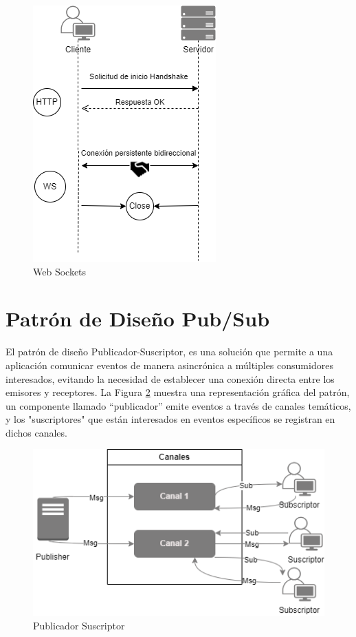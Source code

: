 \begin{figure}[h]
    \centering
    \includegraphics[width=0.5\linewidth]{fig/sockets.png}
    \caption{Web Sockets}
    \label{fig:sockets}
\end{figure}




\section{Patrón de Diseño Pub/Sub}\label{sec:pub-sub}

El patrón de diseño Publicador-Suscriptor, es una solución que permite a una aplicación comunicar eventos de manera asincrónica a múltiples consumidores interesados, evitando la necesidad de establecer una conexión directa entre los emisores y receptores.  La Figura \ref{fig:pub-sus} muestra una representación gráfica del patrón, un componente llamado ``publicador'' emite eventos a través de canales temáticos, y los "suscriptores" que están interesados en eventos específicos se registran en dichos canales.


\begin{figure}[h]
    \centering
    \includegraphics[width=0.8\linewidth]{fig/chanels.png}
    \caption{Publicador Suscriptor}
    \label{fig:pub-sus}
\end{figure}


